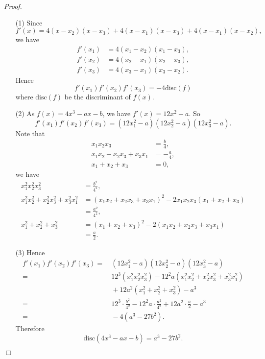 \documentclass{article}
\begin{document}
\emph{Proof.}
\begin{enumerate}
\item[(1)]
  Since
  \[
    f'(x) = 4(x-x_2)(x-x_3) + 4(x-x_1)(x-x_3) + 4(x-x_1)(x-x_2),
  \]
  we have
  \begin{align*}
    f'(x_1) &= 4(x_1-x_2)(x_1-x_3), \\
    f'(x_2) &= 4(x_2-x_1)(x_2-x_3), \\
    f'(x_3) &= 4(x_3-x_1)(x_3-x_2).
  \end{align*}
  Hence
  \[
    f'(x_1)f'(x_2)f'(x_3) = -4 \mathrm{disc}(f)
  \]
  where $\mathrm{disc}(f)$ be the discriminant of $f(x)$.

\item[(2)]
  As $f(x) = 4x^3 - ax - b$, we have $f'(x) = 12x^2 - a$.
  So
  \[
    f'(x_1)f'(x_2)f'(x_3) = (12x_1^2 - a)(12x_2^2 - a)(12x_3^2 - a).
  \]
  Note that
  \begin{align*}
    x_1 x_2 x_3 &= \frac{b}{4}, \\
    x_1 x_2 + x_2 x_3 + x_3 x_1 &= -\frac{a}{4}, \\
    x_1 + x_2 + x_3 &= 0,
  \end{align*}
  we have
  \begin{align*}
    x_1^2 x_2^2 x_3^2
    &= \frac{b^2}{4^2}, \\
    x_1^2 x_2^2 + x_2^2 x_3^2 + x_3^2 x_1^2
    &= (x_1 x_2 + x_2 x_3 + x_3 x_1)^2 - 2 x_1 x_2 x_3(x_1 + x_2 + x_3) \\
    &= \frac{a^2}{4^2}, \\
    x_1^2 + x_2^2 + x_3^2
    &= (x_1 + x_2 + x_3)^2 - 2(x_1 x_2 + x_2 x_3 + x_3 x_1) \\
    &= \frac{a}{2}.
  \end{align*}

\item[(3)]
  Hence
  \begin{align*}
    f'(x_1)f'(x_2)f'(x_3)
    =&\: (12x_1^2 - a)(12x_2^2 - a)(12x_3^2 - a) \\
    =&\: 12^3 (x_1^2 x_2^2 x_3^2) - 12^2 a(x_1^2 x_2^2 + x_2^2 x_3^2 + x_3^2 x_1^2) \\
      &\: + 12 a^2(x_1^2 + x_2^2 + x_3^2) - a^3 \\
    =&\: 12^3 \cdot \frac{b^2}{4^2} - 12^2 a \cdot \frac{a^2}{4^2}
      + 12 a^2 \cdot \frac{a}{2} - a^3 \\
    =&\: -4(a^3 - 27b^2).
  \end{align*}
  Therefore
  \[
    \mathrm{disc}(4x^3 - ax - b) = a^3 - 27b^2.
  \]
\end{enumerate}
$\Box$ \\\\
\end{document}
